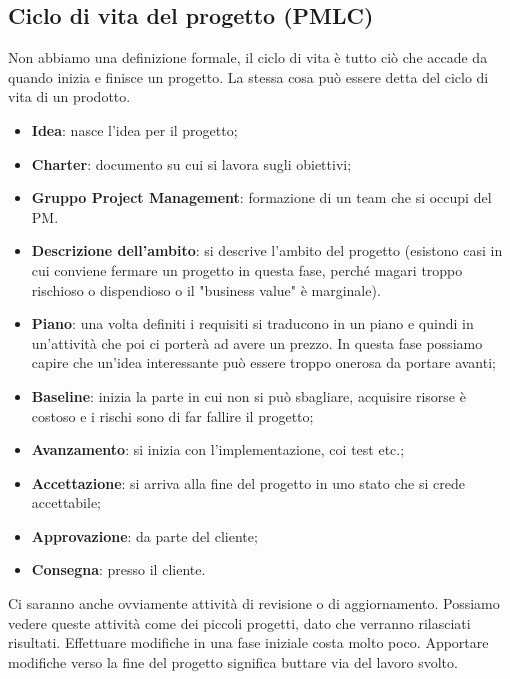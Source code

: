 \subsection{Ciclo di vita del progetto (PMLC)}
Non abbiamo una definizione formale, il ciclo di vita è tutto ciò che accade da quando inizia e finisce un progetto. La stessa cosa può essere detta del ciclo di vita di un prodotto.
\begin{itemize}
	\item \textbf{Idea}: nasce l'idea per il progetto;
	\item \textbf{Charter}: documento su cui si lavora sugli obiettivi;
	\item \textbf{Gruppo Project Management}: formazione di un team che si occupi del PM.
	\item \textbf{Descrizione dell'ambito}: si descrive l'ambito del progetto (esistono casi in cui conviene fermare un progetto in questa fase, perché magari troppo rischioso o dispendioso o il "business value" è marginale).
	\item \textbf{Piano}: una volta definiti i requisiti si traducono in un piano e quindi in un'attività che poi ci porterà ad avere un prezzo. In questa fase possiamo capire che un'idea interessante può essere troppo onerosa da portare avanti;
	\item \textbf{Baseline}: inizia la parte in cui non si può sbagliare, acquisire risorse è costoso e i rischi sono di far fallire il progetto;
	\item \textbf{Avanzamento}: si inizia con l'implementazione, coi test etc.;
	\item \textbf{Accettazione}: si arriva alla fine del progetto in uno stato che si crede accettabile;
	\item \textbf{Approvazione}: da parte del cliente;
	\item \textbf{Consegna}: presso il cliente.
\end{itemize}
Ci saranno anche ovviamente attività di revisione o di aggiornamento. Possiamo vedere queste attività come dei piccoli progetti, dato che verranno rilasciati risultati.
\noindent Effettuare modifiche in una fase iniziale costa molto poco. Apportare modifiche verso la fine del progetto significa buttare via del lavoro svolto.
